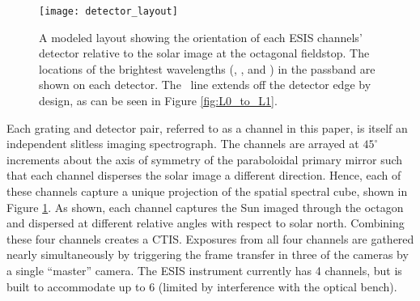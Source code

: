     	

    	

    	
        \begin{figure}[ht]
			\begin{center}
				\texttt{[image: detector\_layout]}
				\caption{A modeled layout showing the orientation of each ESIS channels' detector relative to the solar image at the octagonal fieldstop.  The locations of the brightest wavelengths (\hei, \mgxbright, and \ov) in the passband are shown on each detector.  The \hei \ line  extends off the detector edge by design, as can be seen in Figure \ref{fig:L0_to_L1}. }
				\label{fig:level_1_array}
			\end{center}
		\end{figure}

    	Each grating and detector pair, referred to as a channel in this paper,
    	is itself an independent slitless imaging spectrograph.  
    	The channels are arrayed at $45^{\circ}$ increments about the axis of symmetry of the paraboloidal primary mirror such that each channel disperses the solar image a different direction. 
    	Hence, each of these channels capture a unique projection of the spatial spectral cube, shown in Figure \ref{fig:level_1_array}. 
    	As shown, each channel captures the Sun imaged through the octagon and dispersed at different relative angles with respect to solar north. Combining these four channels creates a CTIS. 
    	Exposures from all four channels are gathered nearly simultaneously by triggering the frame transfer in three of the cameras by a single ``master'' camera. 
    	The ESIS instrument currently has 4 channels, but is built to accommodate up to 6 (limited by interference with the optical bench).

    
